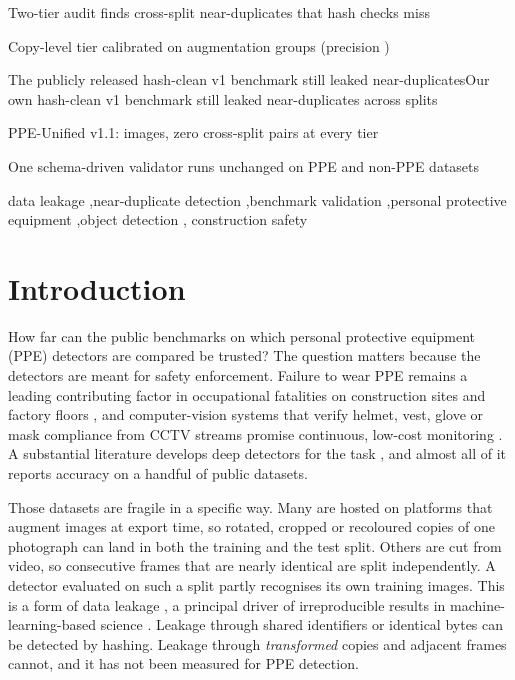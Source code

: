 \documentclass[review,12pt]{elsarticle}
\newcommand{\anonor}[2]{\ifdefined\ANON#1\else#2\fi}
\begin{document}
\begin{frontmatter}
\begin{highlights}
\item Two-tier audit finds cross-split near-duplicates that hash checks miss
\item Copy-level tier calibrated on augmentation groups (precision \nholdP)
\item \anonor{The publicly released hash-clean v1 benchmark still leaked near-duplicates}{Our own hash-clean v1 benchmark still leaked near-duplicates across splits}
\item PPE-Unified v1.1: \nimgV{} images, zero cross-split pairs at every tier
\item One schema-driven validator runs unchanged on PPE and non-PPE datasets
\end{highlights}

\begin{keyword}
data leakage \sep near-duplicate detection \sep benchmark validation
\sep personal protective equipment \sep object detection \sep
construction safety
\end{keyword}

\end{frontmatter}

\section{Introduction}
\label{sec:intro}

How far can the public benchmarks on which personal protective
equipment (PPE) detectors are compared be trusted? The question
matters because the detectors are meant for safety enforcement.
Failure to wear PPE remains a leading contributing factor in
occupational fatalities on construction sites and factory floors
\citep{winge2018accident}, and computer-vision systems that verify
helmet, vest, glove or mask compliance from CCTV streams promise
continuous, low-cost monitoring \citep{seo2015vision,fang2020review}.
A substantial literature develops deep detectors for the task
\citep{fang2018hardhat,nath2020ppe,wu2019gdut,delhi2020ppe,
vukicevic2024review,pisu2024ppe}, and almost all of it reports
accuracy on a handful of public datasets.

Those datasets are fragile in a specific way. Many are hosted on
platforms that augment images at export time, so rotated, cropped or
recoloured copies of one photograph can land in both the training and
the test split. Others are cut from video, so consecutive frames that
are nearly identical are split independently. A detector evaluated on
such a split partly recognises its own training images. This is a form
of data leakage \citep{kaufman2012leakage}, a principal driver of
irreproducible results in machine-learning-based science
\citep{kapoor2023leakage}. Leakage through shared identifiers or
identical bytes can be detected by hashing. Leakage through
\emph{transformed} copies and adjacent frames cannot, and it has not
been measured for PPE detection.
\end{document}
